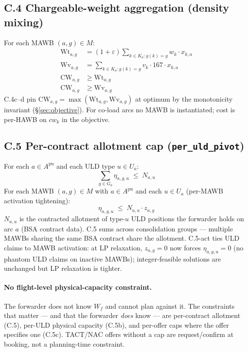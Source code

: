 \documentclass[11pt,a4paper]{article}
\theoremstyle{definition}
\begin{document}
\subsection*{C.4 Chargeable-weight aggregation (density mixing)}

For each MAWB $(a, g) \in M$:
\begin{align}
  \text{Wt}_{a,g} &= (1 + \varepsilon) \sum_{k \in K_a : g(k) = g} w_k \cdot x_{k,a}
    \tag{C.4a} \label{eq:C4a} \\
  \text{Wv}_{a,g} &= \sum_{k \in K_a : g(k) = g} v_k \cdot 167 \cdot x_{k,a}
    \tag{C.4b} \label{eq:C4b} \\
  \text{CW}_{a,g} &\geq \text{Wt}_{a,g}
    \tag{C.4c} \label{eq:C4c} \\
  \text{CW}_{a,g} &\geq \text{Wv}_{a,g}
    \tag{C.4d} \label{eq:C4d}
\end{align}
C.4c--d pin $\text{CW}_{a,g} = \max(\text{Wt}_{a,g}, \text{Wv}_{a,g})$ at
optimum by the monotonicity invariant (\S\ref{sec:objective}). For co-load
arcs no MAWB is instantiated; cost is per-HAWB on $cw_k$ in the objective.

\subsection*{C.5 Per-contract allotment cap (\texttt{per\_uld\_pivot})}

For each $a \in A^{\text{pu}}$ and each ULD type $u \in U_a$:
\begin{equation}
  \sum_{g \in G_a} \eta_{a,g,u} \;\leq\; N_{a,u}
  \label{eq:C5}
\end{equation}
For each MAWB $(a, g) \in M$ with $a \in A^{\text{pu}}$ and each $u \in U_a$
(per-MAWB activation tightening):
\begin{equation}
  \eta_{a,g,u} \;\leq\; N_{a,u} \cdot z_{a,g}
  \tag{C.5-act} \label{eq:C5-act}
\end{equation}
$N_{a,u}$ is the contracted allotment of type-$u$ ULD positions the forwarder
holds on arc $a$ (BSA contract data). C.5 sums across consolidation groups
--- multiple MAWBs sharing the same BSA contract share the allotment. C.5-act
ties ULD claims to MAWB activation: at LP relaxation, $z_{a,g} = 0$ now
forces $\eta_{a,g,u} = 0$ (no phantom ULD claims on inactive MAWBs);
integer-feasible solutions are unchanged but LP relaxation is tighter.

\paragraph{No flight-level physical-capacity constraint.}
The forwarder does not know $W_f$ and cannot plan against it. The constraints
that matter --- and that the forwarder \emph{does} know --- are per-contract
allotment (C.5), per-ULD physical capacity (C.5b), and per-offer caps where
the offer specifies one (C.5c). TACT/NAC offers without a cap are
request/confirm at booking, not a planning-time constraint.
\end{document}
